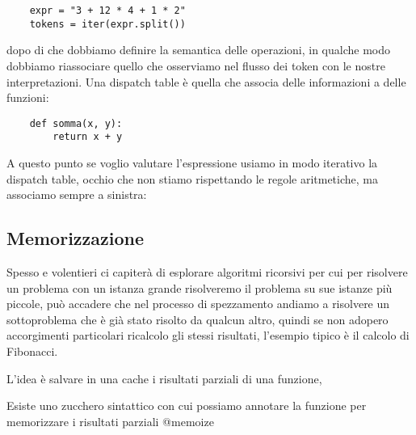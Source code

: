 \begin{lstlisting}
    expr = "3 + 12 * 4 + 1 * 2"
    tokens = iter(expr.split())
\end{lstlisting}

dopo di che dobbiamo definire la semantica delle operazioni, in qualche modo dobbiamo riassociare quello che osserviamo nel flusso dei token con le nostre interpretazioni. Una dispatch table è quella che associa delle informazioni a delle funzioni:

\begin{lstlisting}
    def somma(x, y):
        return x + y
\end{lstlisting}

A questo punto se voglio valutare l'espressione usiamo in modo iterativo la dispatch table, occhio che non stiamo rispettando le regole aritmetiche, ma associamo sempre a sinistra:

\subsection{Memorizzazione}
Spesso e volentieri ci capiterà di esplorare algoritmi ricorsivi per cui per risolvere un problema con un istanza grande risolveremo il problema su sue istanze più piccole, può accadere che nel processo di spezzamento andiamo a risolvere un sottoproblema che è già stato risolto da qualcun altro, quindi se non adopero accorgimenti particolari ricalcolo gli stessi risultati, l'esempio tipico è il calcolo di Fibonacci.

L'idea è salvare in una cache i risultati parziali di una funzione,

Esiste uno zucchero sintattico con cui possiamo annotare la funzione per memorizzare i risultati parziali @memoize